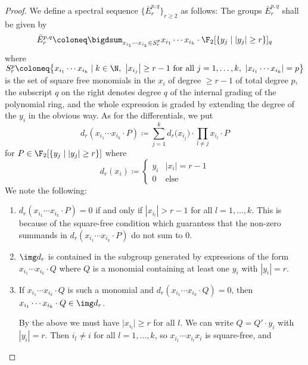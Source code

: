 \begin{proof}
	We define a spectral sequence $\big\{\bar{E}_r^{p, q}\big\}_{r \geq 2}$ as follows:
	The groups $\bar{E}_r^{p, q}$ shall be given by
	\begin{equation*}
		\bar{E}_r^{p, q} \coloneq \bigdsum_{x_{i_1} \cdots x_{i_k} \in S^p_r} x_{i_1} \cdots x_{i_k} \cdot \F_2[\{y_j \mid |y_j| \geq r\}]_q
	\end{equation*}
	where $S^p_r \coloneq \big\{x_{i_1} \cdots x_{i_k} \mid k \in \N,\ \big|x_{i_j}\big| \geq r - 1 \text{ for all } j = 1, \ldots, k,\ |x_{i_1} \cdots x_{i_k}| = p\big\}$ is the set of square free monomials in the $x_i$ of degree $\geq r - 1$ of total degree $p$, the subscript $q$ on the right denotes degree $q$ of the internal grading of the polynomial ring, and the whole expression is graded by extending the degree of the $y_i$ in the obvious way.
	As for the differentials, we put
	\begin{equation*}
		d_r(x_{i_1} \cdots x_{i_k} \cdot P) \coloneq \sum_{j = 1}^k d_r\big(x_{i_j}\big) \cdot \prod_{l \neq j} x_{i_l} \cdot P
	\end{equation*}
	for $P \in \F_2[\{y_j \mid |y_j| \geq r\}]$ where
	\begin{equation*}
		d_r(x_i) \coloneq \begin{cases}
			y_i & |x_i| = r - 1 \\
			0 	& \text{else}
		\end{cases}
	\end{equation*}
	We note the following:
	\begin{enumerate}
		\item $d_r(x_{i_1} \cdots x_{i_k} \cdot P) = 0$ if and only if $|x_{i_l}| > r - 1$ for all $l = 1, \ldots, k$.
			This is because of the square-free condition which guarantess that the non-zero summands in $d_r(x_{i_1} \cdots x_{i_k} \cdot P)$ do not sum to 0.
		\item $\img d_r$ is contained in the subgroup generated by expressions of the form $x_{i_1} \cdots x_{i_k} \cdot Q$ where $Q$ is a monomial containing at least one $y_i$ with $|y_i| = r$.
		\item If $x_{i_1} \cdots x_{i_k} \cdot Q$ is such a monomial and $d_r(x_{i_1} \cdots x_{i_k} \cdot Q) = 0$, then $x_{i_1} \cdots x_{i_k} \cdot Q \in \img d_r$.
			\begin{smallproof}
				By the above we must have $\big|x_{i_l}\big| \geq r$ for all $l$.
				We can write $Q = Q' \cdot y_i$ with $|y_i| = r$.
				Then $i_l \neq i$ for all $l = 1, \ldots, k$, so $x_{i_1} \cdots x_{i_l} x_i$ is square-free, and

\end{smallproof}
\end{enumerate}
\end{proof}
